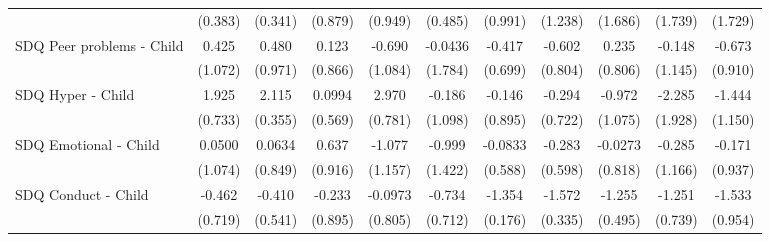{\begin{tabular}{l*{10}{c}}
            &     (0.383)         &     (0.341)         &     (0.879)         &     (0.949)         &     (0.485)         &     (0.991)         &     (1.238)         &     (1.686)         &     (1.739)         &     (1.729)         \\
\addlinespace
SDQ Peer problems - Child&       0.425         &       0.480         &       0.123         &      -0.690         &     -0.0436         &      -0.417         &      -0.602         &       0.235         &      -0.148         &      -0.673         \\
            &     (1.072)         &     (0.971)         &     (0.866)         &     (1.084)         &     (1.784)         &     (0.699)         &     (0.804)         &     (0.806)         &     (1.145)         &     (0.910)         \\
\addlinespace
SDQ Hyper - Child&       1.925\sym{**} &       2.115\sym{***}&      0.0994         &       2.970\sym{***}&      -0.186         &      -0.146         &      -0.294         &      -0.972         &      -2.285         &      -1.444         \\
            &     (0.733)         &     (0.355)         &     (0.569)         &     (0.781)         &     (1.098)         &     (0.895)         &     (0.722)         &     (1.075)         &     (1.928)         &     (1.150)         \\
\addlinespace
SDQ Emotional - Child&      0.0500         &      0.0634         &       0.637         &      -1.077         &      -0.999         &     -0.0833         &      -0.283         &     -0.0273         &      -0.285         &      -0.171         \\
            &     (1.074)         &     (0.849)         &     (0.916)         &     (1.157)         &     (1.422)         &     (0.588)         &     (0.598)         &     (0.818)         &     (1.166)         &     (0.937)         \\
\addlinespace
SDQ Conduct - Child&      -0.462         &      -0.410         &      -0.233         &     -0.0973         &      -0.734         &      -1.354\sym{***}&      -1.572\sym{***}&      -1.255\sym{*}  &      -1.251         &      -1.533         \\
            &     (0.719)         &     (0.541)         &     (0.895)         &     (0.805)         &     (0.712)         &     (0.176)         &     (0.335)         &     (0.495)         &     (0.739)         &     (0.954)         \\
\bottomrule
\end{tabular}
}
